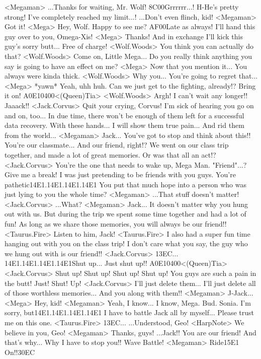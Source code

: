 <Megaman> ...Thanks for waiting, Mr. Wolf! 
{8C}{00}Grrrrrr...! H-He's pretty strong! 
I've completely reached my limit...! 
...Don't even flinch, kid! 
<Megaman> Got it! 
<Mega> Hey, Wolf. Happy to see me? 
{AF}{00}Late as always! 
I'll hand this guy over to you, Omega-Xis! 
<Mega> Thanks! 
And in exchange I'll kick this guy's sorry butt... Free of charge! 
<Wolf.Woods> You think you can actually do that? 
<Wolf.Woods> Come on, Little Mega... 
Do you really think anything you say is going to have an effect on me? 
<Mega> Now that you mention it... You always were kinda thick. 
<Wolf.Woods> Why you... You're going to regret that... 
<Mega> *yawn* Yeah, uhh huh. 
Can we just get to the fighting, already!? Bring it on! 
{A0}{E1}{04}{00}<(Queen)Tia> 
<Wolf.Woods> Argh! I can't wait any longer!! 
Jaaack!! 
<Jack.Corvus> Quit your crying, Corvus! 
I'm sick of hearing you go on and on, too... 
In due time, there won't be enough of them left for a successful data recovery. 
With these hands... I will show them true pain... 
And rid them from the world... 
<Megaman> Jack... 
You've got to stop and think about this!! 
You're our classmate... And our friend, right!? 
We went on our class trip together, and made a lot of great memories. 
Or was that all an act!? 
<Jack.Corvus> You're the one that needs to wake up, Mega Man. 
"Friend"...? 
Give me a break! 
I was just pretending to be friends with you guys. 
You're pathetic{14}{E1}.{14}{E1}.{14}{E1}.{14}{E1} 
You put that much hope into a person who was just lying to you the whole time? 
<Megaman> ...That stuff doesn't matter! 
<Jack.Corvus> ...What? 
<Megaman> Jack... It doesn't matter why you hung out with us. 
But during the trip we spent some time together and had a lot of fun! 
As long as we share those memories, you will always be our friend!! 
<Taurus.Fire> Listen to him, Jack! 
<Taurus.Fire> I also had a super fun time hanging out with you on the class trip! 
I don't care what you say, the guy who we hung out with is our friend!! 
<Jack.Corvus> {13}{EC}... 
{14}{E1}.{14}{E1}.{14}{E1}.{14}{E1}Shut up... 
Just shut up!! 
{A0}{E1}{04}{00}<(Queen)Tia> 
<Jack.Corvus> Shut up! Shut up! Shut up! Shut up! 
You guys are such a pain in the butt! Just! Shut! Up! 
<Jack.Corvus> I'll just delete them... 
I'll just delete all of those worthless memories... 
And you along with them!! 
<Megaman> J-Jack... 
<Mega> Hey, kid! 
<Megaman> Yeah, I know... 
I know, Mega. 
Bud. Sonia. 
I'm sorry, but{14}{E1}.{14}{E1}.{14}{E1}.{14}{E1} I have to battle Jack all by myself... 
Please trust me on this one. 
<Taurus.Fire> {13}{EC}... 
...Understood, Geo! 
<HarpNote> We believe in you, Geo! 
<Megaman> Thanks, guys! 
...Jack!! 
You are our friend! 
And that's why... Why I have to stop you!! 
Wave Battle! 
<Megaman> Ride{15}{E1} On!!{30}{EC}
